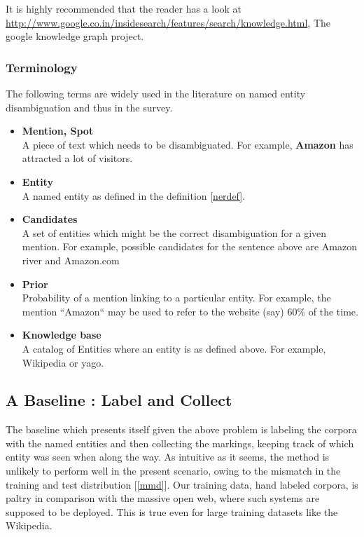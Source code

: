 It is highly recommended that the reader has a look at \url{http://www.google.co.in/insidesearch/features/search/knowledge.html}, 
The google knowledge graph project.


\subsubsection{Terminology}
The following terms are widely used in the literature on named entity disambiguation and thus in the survey.

\begin{itemize}
 \item \textbf{Mention, Spot} \\
 A piece of text which needs to be disambiguated. For example, \textbf{Amazon} has attracted a lot of visitors.
 \item \textbf{Entity} \\
 A named entity as defined in the definition \ref{nerdef}. 
 \item \textbf{Candidates} \\
 A set of entities which might be the correct disambiguation for a given mention.
 For example, possible candidates for the sentence above are Amazon river and Amazon.com
 \item \textbf{Prior} \\
 Probability of a mention linking to a particular entity. For example, the mention ``Amazon`` may be used
 to refer to the website (say) 60\% of the time.
 \item \textbf{Knowledge base} \\
 A catalog of Entities where an entity is as defined above. For example, Wikipedia or yago.

\end{itemize}

\subsection{A Baseline : Label and Collect}
The baseline which presents itself given the above problem is labeling the corpora with the named 
entities and then collecting the markings, keeping track of which entity was seen when along the way. 
As intuitive as it seems, the method is unlikely to perform well in the present scenario, owing to 
the mismatch in the training and test distribution [\ref{mmd}]. 
Our training data, hand labeled corpora, is paltry in comparison with the massive open web, where such 
systems are supposed to be deployed. This is true even for large training datasets like the Wikipedia.

